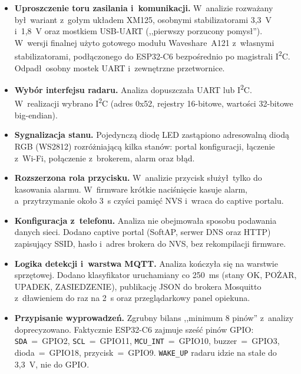 \documentclass[11pt,a4paper]{article}
\begin{document}
\begin{itemize}[leftmargin=1.4em]
  \item \textbf{Uproszczenie toru zasilania i~komunikacji.} W~analizie rozwa\.zany
        by\l\ wariant z~go\l ym uk\l adem XM125, osobnymi stabilizatorami 3,3~V
        i~1,8~V oraz mostkiem USB-UART (,,pierwszy porzucony pomys\l''). W~wersji
        finalnej u\.zyto gotowego modu\l u Waveshare~A121 z~w\l asnymi
        stabilizatorami, pod\l \k aczonego do ESP32-C6 bezpo\'srednio po magistrali
        I\textsuperscript{2}C. Odpad\l\ osobny mostek UART i~zewn\k etrzne przetwornice.
  \item \textbf{Wyb\'or interfejsu radaru.} Analiza dopuszcza\l a UART lub
        I\textsuperscript{2}C. W~realizacji wybrano I\textsuperscript{2}C
        (adres 0x52, rejestry 16-bitowe, warto\'sci 32-bitowe big-endian).
  \item \textbf{Sygnalizacja stanu.} Pojedyncz\k a diod\k e LED zast\k apiono
        adresowaln\k a diod\k a RGB (WS2812) rozr\'o\.zniaj\k ac\k a kilka stan\'ow:
        portal konfiguracji, \l \k aczenie z~Wi-Fi, po\l \k aczenie z~brokerem, alarm
        oraz b\l \k ad.
  \item \textbf{Rozszerzona rola przycisku.} W~analizie przycisk s\l u\.zy\l\ tylko
        do kasowania alarmu. W~firmware kr\'otkie naci\'sni\k ecie kasuje alarm,
        a~przytrzymanie oko\l o 3~s czy\'sci pami\k e\'c NVS i~wraca do captive portalu.
  \item \textbf{Konfiguracja z~telefonu.} Analiza nie obejmowa\l a sposobu podawania
        danych sieci. Dodano captive portal (SoftAP, serwer DNS oraz HTTP) zapisuj\k acy
        SSID, has\l o i~adres brokera do NVS, bez rekompilacji firmware.
  \item \textbf{Logika detekcji i~warstwa MQTT.} Analiza ko\'nczy\l a si\k e na
        warstwie sprz\k etowej. Dodano klasyfikator uruchamiany co 250~ms
        (stany OK, PO\.ZAR, UPADEK, ZASIEDZENIE), publikacj\k e JSON do brokera
        Mosquitto z~d\l awieniem do raz na 2~s oraz przegl\k adarkowy panel opiekuna.
  \item \textbf{Przypisanie wyprowadze\'n.} Zgrubny bilans ,,minimum 8 pin\'ow''
        z~analizy doprecyzowano. Faktycznie ESP32-C6 zajmuje sze\'s\'c pin\'ow GPIO:
        \texttt{SDA}~=~GPIO2, \texttt{SCL}~=~GPIO11, \texttt{MCU\_INT}~=~GPIO10,
        buzzer~=~GPIO3, dioda~=~GPIO18, przycisk~=~GPIO9. \texttt{WAKE\_UP} radaru
        idzie na sta\l e do 3,3~V, nie do GPIO.
\end{itemize}
\end{document}
